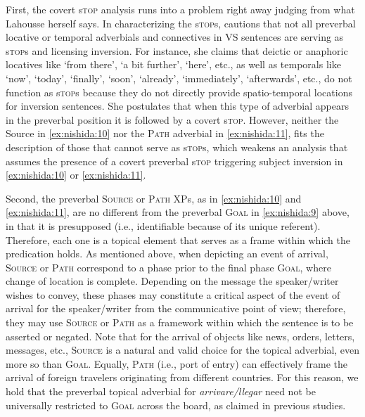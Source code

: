 \documentclass[output=paper,colorlinks,citecolor=brown,
]{langscibook}
\begin{document}
First, the covert s\textsc{top} analysis runs into a problem right away judging from what Lahousse herself says. In characterizing the s\textsc{top}s, \citep[9]{lahousse2007implicit} cautions that not all preverbal locative or temporal adverbials and connectives in VS sentences are serving as s\textsc{top}s and licensing inversion. For instance, she claims that deictic or anaphoric locatives like `from there', `a bit further', `here', etc., as well as temporals like `now', `today', `finally', `soon', `already', `immediately', `afterwards', etc., do not function as s\textsc{top}s because they do not directly provide spatio-temporal locations for inversion sentences. She postulates that when this type of adverbial appears in the preverbal position it is followed by a covert s\textsc{top}. However, neither the Source in \ref{ex:nishida:10} nor the \textsc{Path} adverbial in \ref{ex:nishida:11}, fits the description of those that cannot serve as s\textsc{top}s, which weakens an analysis that assumes the presence of a covert preverbal s\textsc{top} triggering subject inversion in \ref{ex:nishida:10} or \ref{ex:nishida:11}. 

Second, the preverbal \textsc{Source} or \textsc{Path} XPs, as in \ref{ex:nishida:10} and \ref{ex:nishida:11}, are no different from the preverbal \textsc{Goal} in \ref{ex:nishida:9} above, in that it is presupposed (i.e., identifiable because of its unique referent). Therefore, each one is a topical element that serves as a frame within which the predication holds. As mentioned above, when depicting an event of arrival, \textsc{Source} or \textsc{Path} correspond to a phase prior to the final phase \textsc{Goal}, where change of location is complete. Depending on the message the speaker/writer wishes to convey, these phases may constitute a critical aspect of the event of arrival for the speaker/writer from the communicative point of view; therefore, they may use \textsc{Source} or \textsc{Path} as a framework within which the sentence is to be asserted or negated. Note that for the arrival of objects like news, orders, letters, messages, etc., \textsc{Source} is a natural and valid choice for the topical adverbial, even more so than \textsc{Goal}. Equally, \textsc{Path} (i.e., port of entry) can effectively frame the arrival of foreign travelers originating from different countries. For this reason, we hold that the preverbal topical adverbial for \textit{arrivare/llegar} need not be universally restricted to \textsc{Goal} across the board, as claimed in previous studies.
\end{document}
